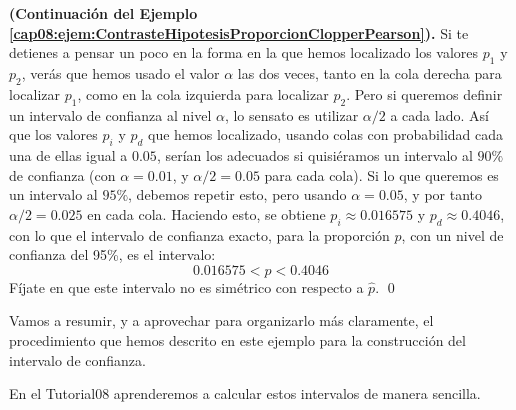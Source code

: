 \begin{ejemplo}{\bf (Continuación del Ejemplo \ref{cap08:ejem:ContrasteHipotesisProporcionClopperPearson}).}
Si te detienes a pensar un poco en la forma en la que hemos localizado los valores $p_1$ y $p_2$, verás que hemos usado el valor $\alpha$ las dos veces, tanto en la cola derecha para localizar $p_1$, como en la cola izquierda para localizar $p_2$. Pero si queremos definir un intervalo de confianza al nivel $\alpha$, lo sensato es utilizar $\alpha/2$ a cada lado. Así que los valores $p_i$ y $p_d$ que hemos localizado, usando colas con probabilidad cada una de ellas igual a $0.05$, serían los adecuados si quisiéramos un intervalo al $90\%$ de confianza (con $\alpha=0.01$, y $\alpha/2=0.05$ para cada cola). Si lo que queremos es un intervalo al $95\%$, debemos repetir esto, pero usando $\alpha=0.05$, y por tanto $\alpha/2=0.025$ en cada cola. Haciendo esto, se obtiene $p_i\approx 0.016575$ y $p_d\approx 0.4046$, con lo que el intervalo de confianza exacto, para la proporción $p$, con un nivel de confianza del 95\%, es el intervalo:
\[0.016575 < p < 0.4046\]
Fíjate en que este intervalo no es simétrico con respecto a $\hat p$.
\qed
\end{ejemplo}
Vamos a resumir, y a aprovechar para organizarlo más claramente, el procedimiento que hemos descrito en este ejemplo para la construcción del intervalo de confianza.
    \begin{center}
    \end{center}
En el Tutorial08 aprenderemos a calcular estos intervalos de manera sencilla.

